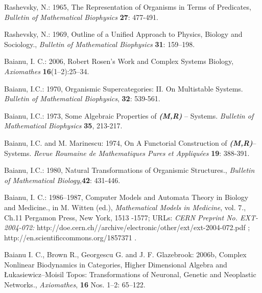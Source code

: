 \documentclass[12pt]{article}
\theoremstyle{plain}
\theoremstyle{definition}
\numberwithin{equation}{section}
\begin{document}
\begin{thebibliography}{99}
Rashevsky, N.: 1965, The Representation of Organisms in Terms of Predicates, \emph{Bulletin of Mathematical Biophysics} \textbf{27}: 477-491.

Rashevsky, N.: 1969, Outline of a Unified Approach to Physics, Biology and Sociology., \emph{Bulletin of Mathematical Biophysics} \textbf{31}: 159--198.

Baianu, I. C.: 2006, Robert Rosen's Work and Complex Systems Biology, \emph{Axiomathes} \textbf{16}(1--2):25--34.

Baianu, I.C.: 1970, Organismic Supercategories: II. On Multistable Systems. \emph{Bulletin of Mathematical Biophysics}, \textbf{32}: 539-561.

Baianu, I.C.: 1973, Some Algebraic Properties of \emph{\textbf{(M,R)}} -- Systems. \emph{Bulletin of Mathematical Biophysics} \textbf{35}, 213-217.

Baianu, I.C. and M. Marinescu: 1974, On A Functorial Construction of \emph{\textbf{(M,R)}}-- Systems. \emph{Revue Roumaine de Mathematiques Pures et Appliqu\'ees} \textbf{19}: 388-391.

Baianu, I.C.: 1980, Natural Transformations of Organismic Structures.,
\emph{Bulletin of Mathematical Biology},\textbf{42}: 431-446.

Baianu, I. C.: 1986--1987, Computer Models and Automata Theory in Biology and Medicine.,  in M. Witten (ed.), \emph{Mathematical Models in Medicine}, vol. 7., Ch.11 Pergamon Press, New York, 1513 -1577; URLs: \emph{CERN Preprint No. EXT-2004-072: } http://doe.cern.ch//archive/electronic/other/ext/ext-2004-072.pdf ;
http://en.scientificcommons.org/1857371 .

Baianu I. C., Brown R., Georgescu G. and J. F. Glazebrook: 2006b, Complex Nonlinear Biodynamics in Categories, Higher Dimensional Algebra and \L ukasiewicz--Moisil Topos: Transformations of Neuronal, Genetic and Neoplastic Networks., \emph{Axiomathes}, \textbf{16} Nos. 1--2: 65--122.

\end{thebibliography}



 


\end{document}
